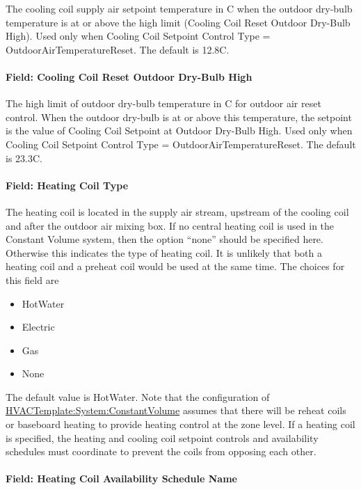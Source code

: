 The cooling coil supply air setpoint temperature in C when the outdoor dry-bulb temperature is at or above the high limit (Cooling Coil Reset Outdoor Dry-Bulb High). Used only when Cooling Coil Setpoint Control Type = OutdoorAirTemperatureReset. The default is 12.8C.

\paragraph{Field: Cooling Coil Reset Outdoor Dry-Bulb High}\label{field-cooling-coil-reset-outdoor-dry-bulb-high-1}

The high limit of outdoor dry-bulb temperature in C for outdoor air reset control. When the outdoor dry-bulb is at or above this temperature, the setpoint is the value of Cooling Coil Setpoint at Outdoor Dry-Bulb High. Used only when Cooling Coil Setpoint Control Type = OutdoorAirTemperatureReset. The default is 23.3C.

\paragraph{Field: Heating Coil Type}\label{field-heating-coil-type-7}

The heating coil is located in the supply air stream, upstream of the cooling coil and after the outdoor air mixing box. If no central heating coil is used in the Constant Volume system, then the option ``none'' should be specified here. Otherwise this indicates the type of heating coil. It is unlikely that both a heating coil and a preheat coil would be used at the same time. The choices for this field are

\begin{itemize}
\item
  HotWater
\item
  Electric
\item
  Gas
\item
  None
\end{itemize}

The default value is HotWater. Note that the configuration of \hyperref[hvactemplatesystemconstantvolume]{HVACTemplate:System:ConstantVolume} assumes that there will be reheat coils or baseboard heating to provide heating control at the zone level. If a heating coil is specified, the heating and cooling coil setpoint controls and availability schedules must coordinate to prevent the coils from opposing each other.

\paragraph{Field: Heating Coil Availability Schedule Name}\label{field-heating-coil-availability-schedule-name-7}

